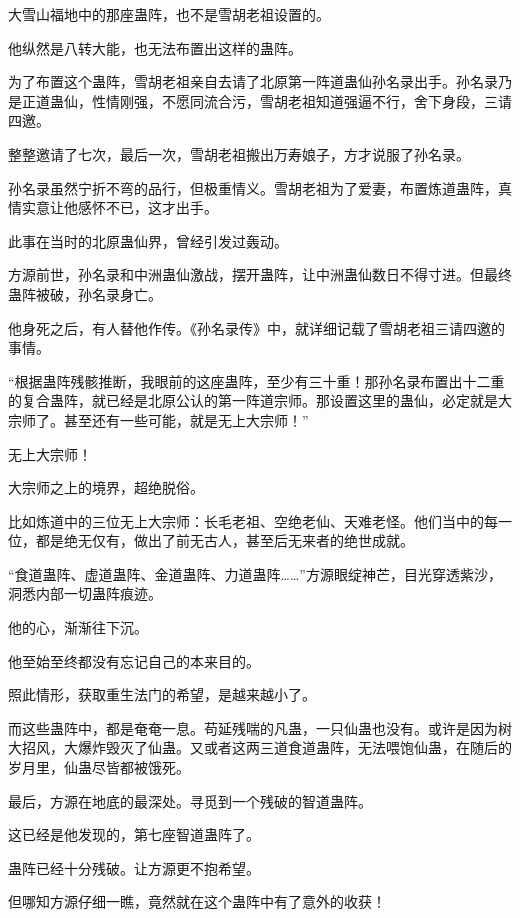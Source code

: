 
\begin{this_body}

大雪山福地中的那座蛊阵，也不是雪胡老祖设置的。

他纵然是八转大能，也无法布置出这样的蛊阵。

为了布置这个蛊阵，雪胡老祖亲自去请了北原第一阵道蛊仙孙名录出手。孙名录乃是正道蛊仙，性情刚强，不愿同流合污，雪胡老祖知道强逼不行，舍下身段，三请四邀。

整整邀请了七次，最后一次，雪胡老祖搬出万寿娘子，方才说服了孙名录。

孙名录虽然宁折不弯的品行，但极重情义。雪胡老祖为了爱妻，布置炼道蛊阵，真情实意让他感怀不已，这才出手。

此事在当时的北原蛊仙界，曾经引发过轰动。

方源前世，孙名录和中洲蛊仙激战，摆开蛊阵，让中洲蛊仙数日不得寸进。但最终蛊阵被破，孙名录身亡。

他身死之后，有人替他作传。《孙名录传》中，就详细记载了雪胡老祖三请四邀的事情。

“根据蛊阵残骸推断，我眼前的这座蛊阵，至少有三十重！那孙名录布置出十二重的复合蛊阵，就已经是北原公认的第一阵道宗师。那设置这里的蛊仙，必定就是大宗师了。甚至还有一些可能，就是无上大宗师！”

无上大宗师！

大宗师之上的境界，超绝脱俗。

比如炼道中的三位无上大宗师：长毛老祖、空绝老仙、天难老怪。他们当中的每一位，都是绝无仅有，做出了前无古人，甚至后无来者的绝世成就。

“食道蛊阵、虚道蛊阵、金道蛊阵、力道蛊阵……”方源眼绽神芒，目光穿透紫沙，洞悉内部一切蛊阵痕迹。

他的心，渐渐往下沉。

他至始至终都没有忘记自己的本来目的。

照此情形，获取重生法门的希望，是越来越小了。

而这些蛊阵中，都是奄奄一息。苟延残喘的凡蛊，一只仙蛊也没有。或许是因为树大招风，大爆炸毁灭了仙蛊。又或者这两三道食道蛊阵，无法喂饱仙蛊，在随后的岁月里，仙蛊尽皆都被饿死。

最后，方源在地底的最深处。寻觅到一个残破的智道蛊阵。

这已经是他发现的，第七座智道蛊阵了。

蛊阵已经十分残破。让方源更不抱希望。

但哪知方源仔细一瞧，竟然就在这个蛊阵中有了意外的收获！


\end{this_body}
